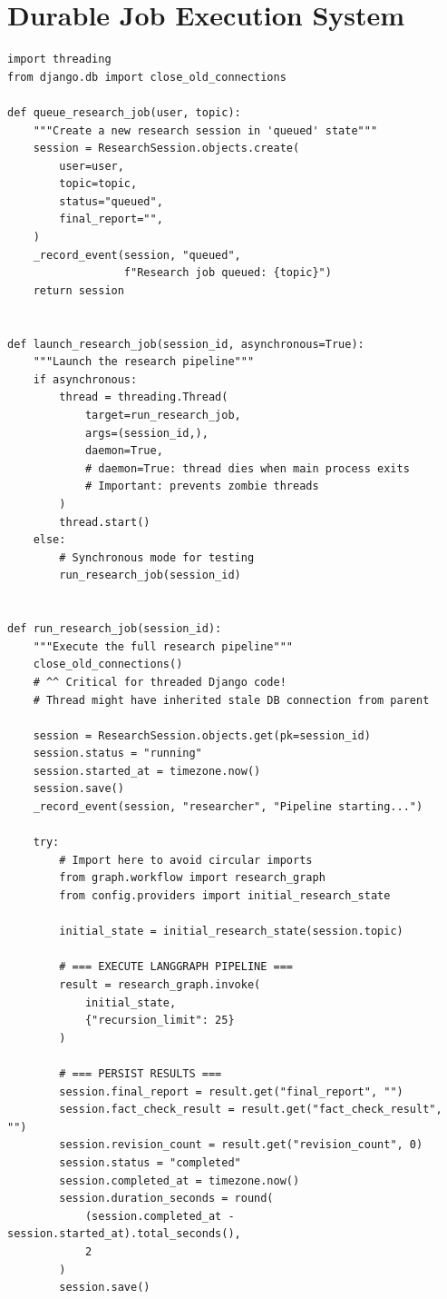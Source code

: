 \documentclass[11pt,a4paper,twoside]{report}
\begin{document}
\section{Durable Job Execution System}

\begin{lstlisting}[style=pythonstyle,caption={services.py --- Background Job Runner}]
import threading
from django.db import close_old_connections

def queue_research_job(user, topic):
    """Create a new research session in 'queued' state"""
    session = ResearchSession.objects.create(
        user=user,
        topic=topic,
        status="queued",
        final_report="",
    )
    _record_event(session, "queued",
                  f"Research job queued: {topic}")
    return session


def launch_research_job(session_id, asynchronous=True):
    """Launch the research pipeline"""
    if asynchronous:
        thread = threading.Thread(
            target=run_research_job,
            args=(session_id,),
            daemon=True,
            # daemon=True: thread dies when main process exits
            # Important: prevents zombie threads
        )
        thread.start()
    else:
        # Synchronous mode for testing
        run_research_job(session_id)


def run_research_job(session_id):
    """Execute the full research pipeline"""
    close_old_connections()
    # ^^ Critical for threaded Django code!
    # Thread might have inherited stale DB connection from parent

    session = ResearchSession.objects.get(pk=session_id)
    session.status = "running"
    session.started_at = timezone.now()
    session.save()
    _record_event(session, "researcher", "Pipeline starting...")

    try:
        # Import here to avoid circular imports
        from graph.workflow import research_graph
        from config.providers import initial_research_state

        initial_state = initial_research_state(session.topic)

        # === EXECUTE LANGGRAPH PIPELINE ===
        result = research_graph.invoke(
            initial_state,
            {"recursion_limit": 25}
        )

        # === PERSIST RESULTS ===
        session.final_report = result.get("final_report", "")
        session.fact_check_result = result.get("fact_check_result", "")
        session.revision_count = result.get("revision_count", 0)
        session.status = "completed"
        session.completed_at = timezone.now()
        session.duration_seconds = round(
            (session.completed_at - session.started_at).total_seconds(),
            2
        )
        session.save()


\end{lstlisting}
\end{document}
